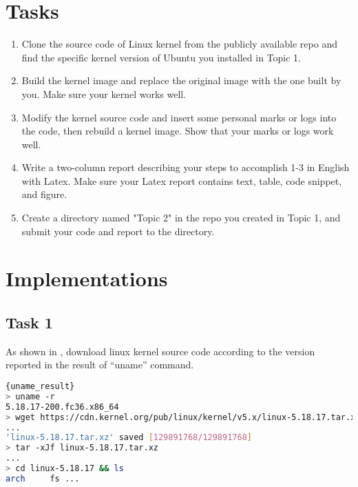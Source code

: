 \documentclass[12pt, a4paper, twocolumn]{article}
\begin{document}

\twocolumn[
  \begin{@twocolumnfalse}
    \maketitle
  \end{@twocolumnfalse}
]


\section{Tasks}

\begin{enumerate}
    \item Clone the source code of Linux kernel from the publicly available repo and find the specific kernel version of Ubuntu you installed in Topic 1.
    \item Build the kernel image and replace the original image with the one built by you. Make sure your kernel works well.
    \item Modify the kernel source code and insert some personal marks or logs into the code, then rebuild a kernel image. Show that your marks or logs work well.
    \item Write a two-column report describing your steps to accomplish 1-3 in English with Latex. Make sure your Latex report contains text, table, code snippet, and figure.
    \item Create a directory named "Topic 2" in the repo you created in Topic 1, and submit your code and report to the directory.
\end{enumerate}

\section{Implementations}

\subsection{Task 1}

As shown in \cite{uname_result}, download linux kernel source code according to the version reported in the result of ``uname'' command.

\begin{lstlisting}[language=bash, caption=Fetch Sources,frame=tlrb]{uname_result}
> uname -r    
5.18.17-200.fc36.x86_64
> wget https://cdn.kernel.org/pub/linux/kernel/v5.x/linux-5.18.17.tar.xz
...
'linux-5.18.17.tar.xz' saved [129891768/129891768]
> tar -xJf linux-5.18.17.tar.xz
...
> cd linux-5.18.17 && ls
arch     fs ...
\end{lstlisting}
\end{document}
